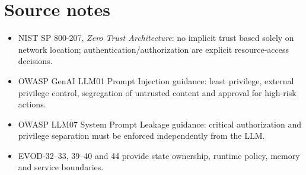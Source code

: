 \chapter*{Source notes}
\begin{itemize}
\item NIST SP 800-207, \emph{Zero Trust Architecture}: no implicit trust based solely on network location; authentication/authorization are explicit resource-access decisions.
\item OWASP GenAI LLM01 Prompt Injection guidance: least privilege, external privilege control, segregation of untrusted content and approval for high-risk actions.
\item OWASP LLM07 System Prompt Leakage guidance: critical authorization and privilege separation must be enforced independently from the LLM.
\item EVOD-32--33, 39--40 and 44 provide state ownership, runtime policy, memory and service boundaries.
\end{itemize}